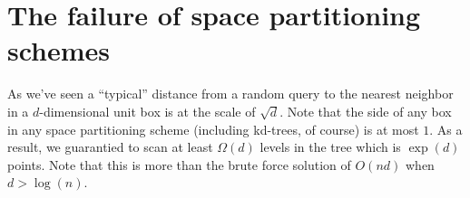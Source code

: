 \documentclass{article}
\begin{document}
\section{The failure of space partitioning schemes}
As we've seen a ``typical'' distance from a random query to the nearest neighbor in a $d$-dimensional unit box is at the scale of $\sqrt{d}$.
Note that the side of any box in any space partitioning scheme (including kd-trees, of course) is at most $1$. 
As a result, we guarantied to scan at least $\Omega(d)$ levels in the tree which is $\exp(d)$ points.
Note that this is more than the brute force solution of $O(nd)$ when $d > \log(n)$. 







\end{document}
